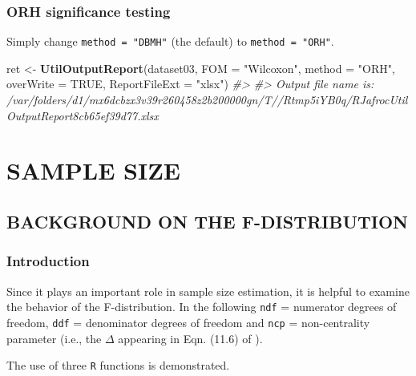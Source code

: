 \documentclass[]{book}
\newenvironment{Shaded}{\begin{snugshade}}{\end{snugshade}}
\newcommand{\CommentTok}[1]{\textcolor[rgb]{0.56,0.35,0.01}{\textit{#1}}}
\newcommand{\DataTypeTok}[1]{\textcolor[rgb]{0.13,0.29,0.53}{#1}}
\newcommand{\KeywordTok}[1]{\textcolor[rgb]{0.13,0.29,0.53}{\textbf{#1}}}
\newcommand{\NormalTok}[1]{#1}
\newcommand{\OtherTok}[1]{\textcolor[rgb]{0.56,0.35,0.01}{#1}}
\newcommand{\StringTok}[1]{\textcolor[rgb]{0.31,0.60,0.02}{#1}}
\begin{document}
\hypertarget{orh-significance-testing-1}{%
\section{ORH significance testing}\label{orh-significance-testing-1}}

Simply change \texttt{method\ =\ "DBMH"} (the default) to \texttt{method\ =\ "ORH"}.

\begin{Shaded}
\begin{Highlighting}[]
\NormalTok{ret <-}\StringTok{ }\KeywordTok{UtilOutputReport}\NormalTok{(dataset03, }\DataTypeTok{FOM =} \StringTok{"Wilcoxon"}\NormalTok{, }\DataTypeTok{method =} \StringTok{"ORH"}\NormalTok{, }\DataTypeTok{overWrite =} \OtherTok{TRUE}\NormalTok{, }\DataTypeTok{ReportFileExt =} \StringTok{"xlsx"}\NormalTok{)}
\CommentTok{#> }
\CommentTok{#> Output file name is:      /var/folders/d1/mx6dcbzx3v39r260458z2b200000gn/T//Rtmp5iYB0q/RJafrocUtilOutputReport8cb65ef39d77.xlsx}
\end{Highlighting}
\end{Shaded}

\hypertarget{part-sample-size}{%
\part*{SAMPLE SIZE}\label{part-sample-size}}

\hypertarget{SSFDistr}{%
\chapter{BACKGROUND ON THE F-DISTRIBUTION}\label{SSFDistr}}

\hypertarget{introduction-6}{%
\section{Introduction}\label{introduction-6}}

Since it plays an important role in sample size estimation, it is helpful to examine the behavior of the F-distribution. In the following \texttt{ndf} = numerator degrees of freedom, \texttt{ddf} = denominator degrees of freedom and \texttt{ncp} = non-centrality parameter (i.e., the \(\Delta\) appearing in Eqn. (11.6) of \citep{RN2680}).

The use of three \texttt{R} functions is demonstrated.
\end{document}
